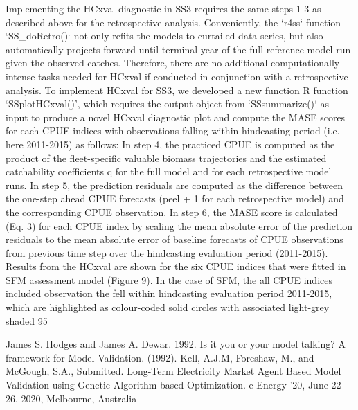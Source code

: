 Implementing the HCxval diagnostic in SS3 requires the same steps 1-3 as described above for the retrospective analysis. Conveniently, the `r4ss` function `SS_doRetro()` not only refits the models to curtailed data series, but also automatically projects forward until terminal year of the full reference model run given the observed catches. Therefore, there are no additional computationally intense tasks needed for HCxval if conducted in conjunction with a retrospective analysis. To implement HCxval for SS3, we developed a new function R function ‘SSplotHCxval()’, which requires the output object from `SSsummarize()` as input to produce a novel HCxval diagnostic plot and compute the MASE scores for each CPUE indices with observations falling within hindcasting period (i.e. here 2011-2015) as follows: In step 4, the practiced CPUE is computed as the product of the fleet-specific valuable  biomass trajectories and the estimated catchability coefficients q for the full model and for each retrospective model runs. In step 5, the prediction residuals are computed as the difference between the one-step ahead CPUE forecasts (peel + 1 for each retrospective model) and the corresponding CPUE observation. In step 6, the MASE score is calculated (Eq. 3) for each CPUE index by scaling the mean absolute error of the prediction residuals to the mean absolute error of baseline forecasts of CPUE observations from previous time step over the hindcasting evaluation period (2011-2015). 
Results from the HCxval are shown for the six CPUE indices that were fitted in SFM assessment model (Figure 9). In the case of SFM, the all CPUE indices included observation the fell within hindcasting evaluation period 2011-2015, which are highlighted as colour-coded solid circles with associated light-grey shaded 95%

James S. Hodges and James A. Dewar. 1992. Is it you or your model talking? A framework for Model Validation. (1992).
Kell, A.J.M, Foreshaw, M., and McGough, S.A., Submitted. Long-Term Electricity Market Agent Based Model Validation using Genetic Algorithm based Optimization. e-Energy ’20, June 22–26, 2020, Melbourne, Australia

\fi
